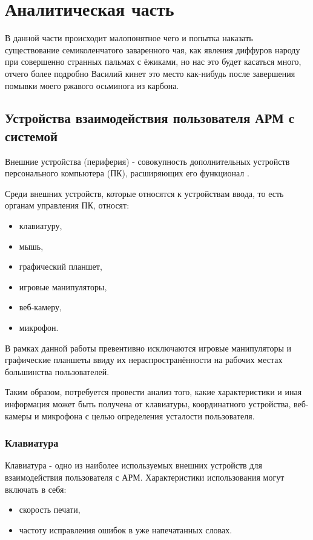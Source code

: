 \section{Аналитическая часть}

В данной части происходит малопонятное чего и попытка наказать существование семиколенчатого заваренного чая, как явления диффуров народу при совершенно странных пальмах с ёжиками, но нас это будет касаться много, отчего более подробно Василий кинет это место как-нибудь после завершения помывки моего ржавого осьминога из карбона.

\subsection{Устройства взаимодействия пользователя АРМ с системой}
Внешние устройства (периферия) - совокупность дополнительных устройств персонального компьютера (ПК), расширяющих его функционал \cite{2hpc}.

Среди внешних устройств, которые относятся к устройствам ввода, то есть органам управления ПК, относят\cite{2hpc}:
\begin{itemize}
\item клавиатуру,
\item мышь,
\item графический планшет,
\item игровые манипуляторы,
\item веб-камеру,
\item микрофон.
\end{itemize}

В рамках данной работы превентивно исключаются игровые манипуляторы и графические планшеты ввиду их нераспространённости на рабочих местах большинства пользователей.

Таким образом, потребуется провести анализ того, какие характеристики и иная информация может быть получена от клавиатуры, координатного устройства, веб-камеры и микрофона с целью определения усталости пользователя.

\subsubsection{Клавиатура}
Клавиатура - одно из наиболее используемых внешних устройств для взаимодействия пользователя с АРМ. Характеристики использования могут включать в себя:
\begin{itemize}
\item скорость печати,
\item частоту исправления ошибок в уже напечатанных словах.
\end{itemize}

